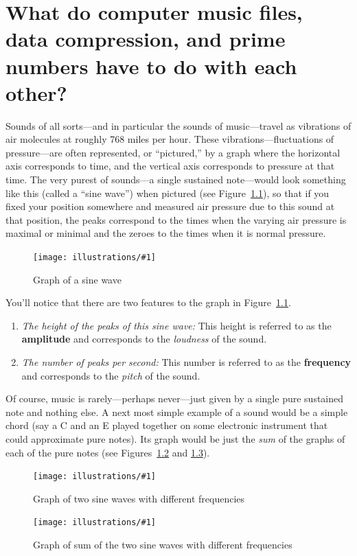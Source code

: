 \documentclass[openany]{book}
\newcommand{\ill}[3]{%
   \begin{figure}[H]%
   \vspace{-2ex}
   \centering%
   \texttt{[image: illustrations/\#1]}%
   \caption{#3}%
   \vspace{-2ex}
    \end{figure}}
\theoremstyle{plain}
\theoremstyle{definition}
\begin{document}
{\chapter[Computer music files and prime numbers]{What do  computer music files,
data compression, and prime numbers have to do with each other?\label{sec:fourier1}}




Sounds of all sorts---and in particular the sounds of music---travel
as vibrations of air molecules at roughly 768 miles per hour. These
vibrations---fluctuations of pressure---are often represented, or
``pictured,'' by a graph where the horizontal axis corresponds to
time, and the vertical axis corresponds to pressure at that time.  The
very purest of sounds---a single sustained note---would look
something like this (called a ``sine wave'') when pictured (see
Figure~\ref{fig:sine}), so that if you fixed your position somewhere
and measured air pressure due to this sound at that position, the
peaks correspond to the times when the varying air pressure is maximal
or minimal and the zeroes to the times when it is normal pressure.

\ill{sin}{.7}{Graph of a sine wave\label{fig:sine}}

You'll notice that there are two features to the graph in Figure~\ref{fig:sine}.

\begin{enumerate}
\item {\em The height of the peaks of this sine wave:} This height is
  referred to as the {\bf amplitude} and corresponds to the {\em
    loudness} of the sound.
\item {\em The number of peaks per second:} This number is referred to
  as the {\bf frequency} and corresponds to the {\em pitch} of the
  sound.
\end{enumerate}


Of course, music is rarely---perhaps never---just given by a single
pure sustained note and nothing else. A next most simple example of a
sound would be a simple chord (say a C and an E played together on
some electronic instrument that could approximate pure notes). Its
graph would be just the {\em sum} of the graphs of each of the pure
notes (see Figures~\ref{fig:sinetwofreq} and \ref{fig:sinetwofreqsum}).


\ill{sin-twofreq}{0.6}{Graph of two sine waves with different frequencies\label{fig:sinetwofreq}}

\ill{sin-twofreq-sum}{.6}{Graph of sum of the two sine waves with different frequencies\label{fig:sinetwofreqsum}}

}
\end{document}

